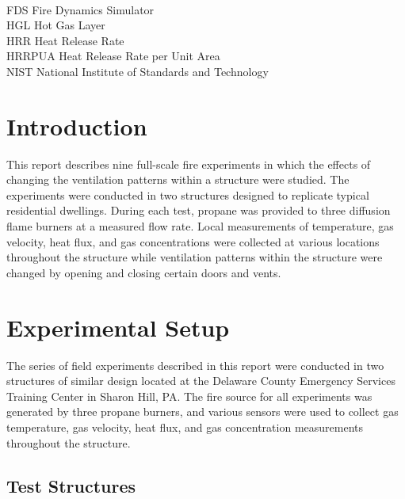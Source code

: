 \documentclass[12pt,oneside]{book}
\begin{document}
\begin{tabbing}
\hspace{1.5in} \= \\
FDS \> Fire Dynamics Simulator \\
HGL \> Hot Gas Layer \\
HRR \> Heat Release Rate \\
HRRPUA \> Heat Release Rate per Unit Area \\
NIST \> National Institute of Standards and Technology \\
\end{tabbing}

\mainmatter

\chapter{Introduction}
\label{chap:Introduction}


This report describes nine full-scale fire experiments in which the effects of changing the ventilation patterns within a structure were studied. The experiments were conducted in two structures designed to replicate typical residential dwellings. During each test, propane was provided to three diffusion flame burners at a measured flow rate. Local measurements of temperature, gas velocity, heat flux, and gas concentrations were collected at various locations throughout the structure while ventilation patterns within the structure were changed by opening and closing certain doors and vents.


\chapter{Experimental Setup}
\label{chap:Experimental_Setup}
The series of field experiments described in this report were conducted in two structures of similar design located at the Delaware County Emergency Services Training Center in Sharon Hill, PA. The fire source for all experiments was generated by three propane burners, and various sensors were used to collect gas temperature, gas velocity, heat flux, and gas concentration measurements throughout the structure.

\section{Test Structures}
\label{sec:Test_Structures}
\end{document}
